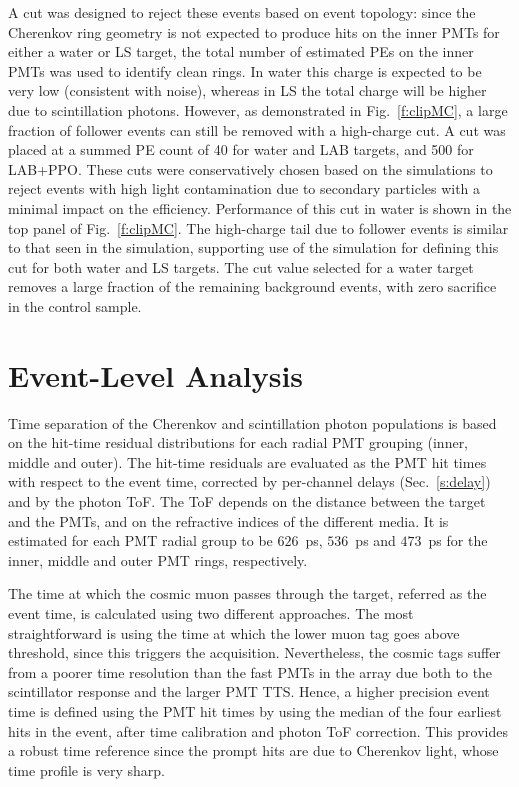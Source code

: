 A cut was designed to reject these events based on event topology: since the Cherenkov ring geometry is not expected to produce hits on the inner PMTs for either a water or LS target, the total number of estimated PEs on the inner PMTs was used to identify clean rings.   In water this charge is expected to be very low (consistent with noise), whereas in LS the total charge will be higher due to scintillation photons.  However, as demonstrated in Fig.~\ref{f:clipMC}, a large fraction of follower events can still be removed with a high-charge cut.   
A cut was placed at a summed PE count of 40 for water and LAB targets, and 500 for LAB+PPO.  
These cuts were conservatively chosen based on the simulations to reject events with high light contamination due to secondary particles with a minimal impact on the efficiency. 
Performance of this cut in water is shown in 
the top panel of Fig.~\ref{f:clipMC}.  The high-charge tail due to follower events is similar to that seen in the simulation, supporting use of the simulation for defining this cut for both water and LS targets. The  cut value selected for a water target removes a large fraction of the remaining background events, with zero sacrifice in the control sample.  

\section{Event-Level Analysis}\label{s:recon}

Time separation of the Cherenkov and scintillation photon populations is based on the hit-time residual distributions for each radial PMT grouping (inner, middle and outer).  The hit-time residuals are evaluated as the PMT hit times with respect to the event time, corrected by per-channel delays (Sec.~\ref{s:delay}) and by the photon ToF.  
The ToF depends on the distance between the target and the PMTs, and on the refractive indices of the different media. It is estimated for each PMT radial group to be $626$~ps, $536$~ps and $473$~ps for the inner, middle and outer PMT rings, respectively.

The time at which the cosmic muon passes through the target, referred as the event time, is calculated using two different approaches. The most straightforward is using the time at which the lower muon tag goes above threshold, since this  triggers the acquisition. Nevertheless, the cosmic tags suffer from a poorer time resolution than the fast PMTs in the array due both to the scintillator response and the larger PMT TTS. 
Hence, a higher precision event time is defined using the PMT hit times by using the median of the four earliest hits in the event, after time calibration and photon ToF correction. This provides a robust time reference since the prompt hits are due to Cherenkov light, whose time profile is very sharp.  

